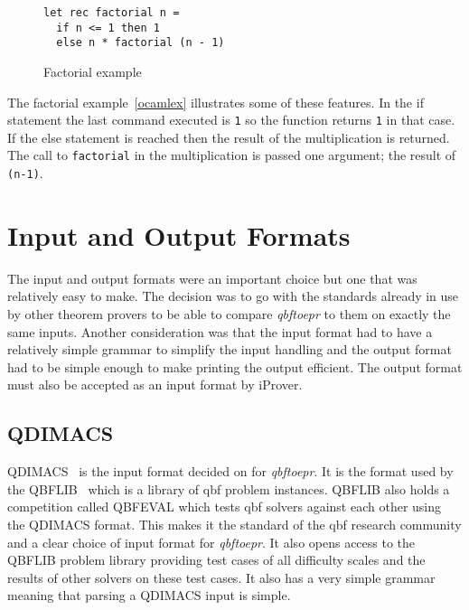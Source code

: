 \begin{figure}[h]
\caption{Factorial example}
\begin{CenteredBox}
\begin{lstlisting}[language=caml, label=ocamlex]
let rec factorial n =
  if n <= 1 then 1
  else n * factorial (n - 1)
\end{lstlisting}
\end{CenteredBox}
\end{figure}

The factorial example~\ref{ocamlex} illustrates some of these features. In the if statement the last command executed is \texttt{1} so the function returns \texttt{1} in that case. If the else statement is reached then the result of the multiplication is returned. The call to \texttt{factorial} in the multiplication is passed one argument; the result of \texttt{(n-1)}.

\section{Input and Output Formats}
The input and output formats were an important choice but one that was relatively easy to make. The decision was to go with the standards already in use by other theorem provers to be able to compare \textit{qbftoepr} to them on exactly the same inputs. Another consideration was that the input format had to have a relatively simple grammar to simplify the input handling and the output format had to be simple enough to make printing the output efficient. The output format must also be accepted as an input format by iProver.

\subsection{QDIMACS}
QDIMACS~\cite{qdimacs} is the input format decided on for \textit{qbftoepr}. It is the format used by the QBFLIB~\cite{qbflib} which is a library of \gls{qbf} problem instances. QBFLIB also holds a competition called QBFEVAL which tests \gls{qbf} solvers against each other using the QDIMACS format. This makes it the standard of the \gls{qbf} research community and a clear choice of input format for \textit{qbftoepr}. It also opens access to the QBFLIB problem library providing test cases of all difficulty scales and the results of other solvers on these test cases. It also has a very simple grammar meaning that parsing a QDIMACS input is simple.

